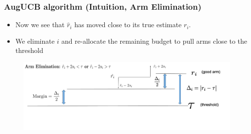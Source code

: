 \begin{frame}
\frametitle{AugUCB algorithm (Intuition, Arm Elimination)}

\begin{itemize}
\item Now we see that $\hat{r}_i$ has moved close to its true estimate $r_i$.
\item We eliminate $i$ and re-allocate the remaining budget to pull arms close to the threshold
\end{itemize}


\begin{figure}
\includegraphics[scale=0.278]{img/ArmElim2.png}
\end{figure}
\end{frame}




